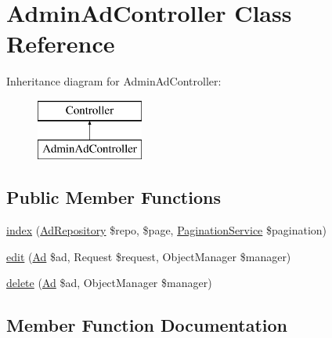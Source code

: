 \hypertarget{class_app_1_1_controller_1_1_admin_ad_controller}{}\section{Admin\+Ad\+Controller Class Reference}
\label{class_app_1_1_controller_1_1_admin_ad_controller}
Inheritance diagram for Admin\+Ad\+Controller\+:\begin{figure}[H]
\begin{center}
\leavevmode
\includegraphics[height=2.000000cm]{class_app_1_1_controller_1_1_admin_ad_controller}
\end{center}
\end{figure}
\subsection*{Public Member Functions}
\begin{DoxyCompactItemize}
\item 
\mbox{\hyperlink{class_app_1_1_controller_1_1_admin_ad_controller_af2235ea6bb1c733202af121331b34e05}{index}} (\mbox{\hyperlink{class_app_1_1_repository_1_1_ad_repository}{Ad\+Repository}} \$repo, \$page, \mbox{\hyperlink{class_app_1_1_service_1_1_pagination_service}{Pagination\+Service}} \$pagination)
\item 
\mbox{\hyperlink{class_app_1_1_controller_1_1_admin_ad_controller_a2d0b3cb3e83150dd16ff78aa9b5bdc78}{edit}} (\mbox{\hyperlink{class_app_1_1_entity_1_1_ad}{Ad}} \$ad, Request \$request, Object\+Manager \$manager)
\item 
\mbox{\hyperlink{class_app_1_1_controller_1_1_admin_ad_controller_a1fd28d9ca7903c3b1cff914b9c4fdb72}{delete}} (\mbox{\hyperlink{class_app_1_1_entity_1_1_ad}{Ad}} \$ad, Object\+Manager \$manager)
\end{DoxyCompactItemize}


\subsection{Member Function Documentation}
\mbox{\label{class_app_1_1_controller_1_1_admin_ad_controller_a1fd28d9ca7903c3b1cff914b9c4fdb72}} 
